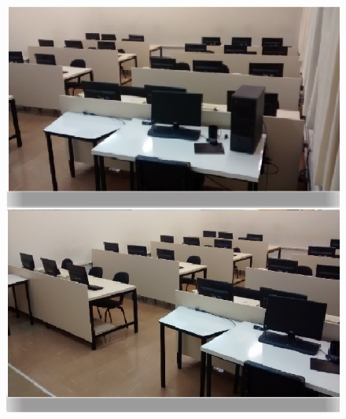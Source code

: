 \documentclass[	DIV=calc,%
							paper=a4,%
							fontsize=12pt,%
							onecolumn]{scrartcl}	 					%
\begin{document}
\begin{figure}[!h]
	\centering
	\includegraphics{laboratorios_2}
\end{figure}
\end{document}
